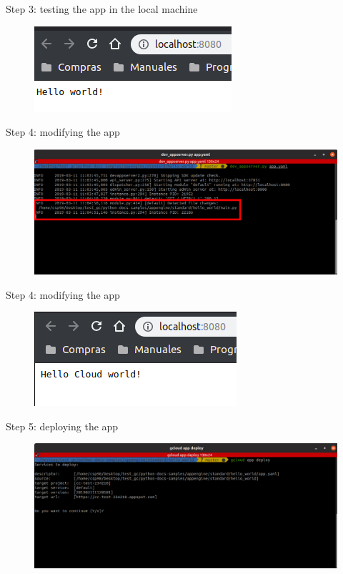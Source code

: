 \documentclass{beamer}
\begin{document}
\begin{frame}[fragile]{Step 3: testing the app in the local machine}
    \begin{figure}[H]
      \centering
      \includegraphics[scale=1]{img/tutorial/5localbrowse}
    \end{figure}
\end{frame}

\begin{frame}[fragile]{Step 4: modifying the app}
    \begin{figure}[H]
      \centering
      \includegraphics[scale=0.33]{img/tutorial/6modify}
    \end{figure}
\end{frame}

\begin{frame}[fragile]{Step 4: modifying the app}
    \begin{figure}[H]
      \centering
      \includegraphics[scale=1]{img/tutorial/7browsemodify}
    \end{figure}
\end{frame}


\begin{frame}[fragile]{Step 5: deploying the app}
    \begin{figure}[H]
      \centering
      \includegraphics[scale=0.33]{img/tutorial/8deploy}
    \end{figure}
\end{frame}
\end{document}
